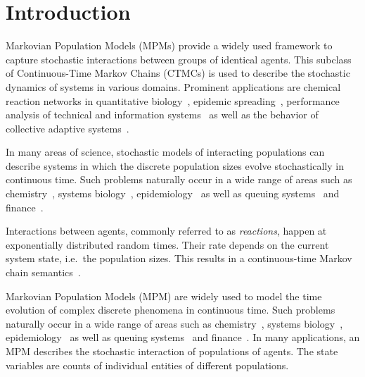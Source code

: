 \chapter{Introduction}



Markovian Population Models (MPMs)    provide a
widely used framework to capture stochastic interactions between groups of identical agents.
This subclass of Continuous-Time Markov Chains (CTMCs)  is used
to describe the stochastic dynamics of systems in various domains.
Prominent applications are chemical reaction networks in quantitative
biology~\cite{BuchWolkenhauer},
epidemic spreading~\cite{porter2016dynamical}, performance analysis  of technical and
information systems~\cite{bortolussi2013,gast2019} as well as the behavior of
collective adaptive systems~\cite{bernardo2016}.








In many areas of science, stochastic models  of interacting populations can describe systems in which the discrete population sizes evolve stochastically in continuous time.
Such problems naturally occur in a wide range of areas such as chemistry~\cite{gillespie1977exact}, systems biology~\cite{wilkinson2018stochastic,ullah2011stochastic}, epidemiology~\cite{mode2000stochastic} as well as    queuing systems~\cite{breuer2003markov} and finance~\cite{pardoux2008markov}.

Interactions between agents, commonly referred to as \emph{reactions}, happen at exponentially distributed random times. 
Their rate depends on the current system state, i.e.\ the population sizes.
This results in a continuous-time Markov chain semantics~\cite{anderson2012continuous}.






Markovian Population Models  (MPM) are widely used to model the time evolution of complex  discrete phenomena in continuous time.
Such problems naturally occur in a wide range of areas such as chemistry~\cite{gillespie1977exact}, systems biology~\cite{wilkinson2018stochastic,ullah2011stochastic}, epidemiology~\cite{mode2000stochastic} as well as    queuing systems~\cite{breuer2003markov} and finance~\cite{pardoux2008markov}.
In many applications, an MPM describes the stochastic interaction of populations of agents.
The state variables are counts of individual entities of different populations.



